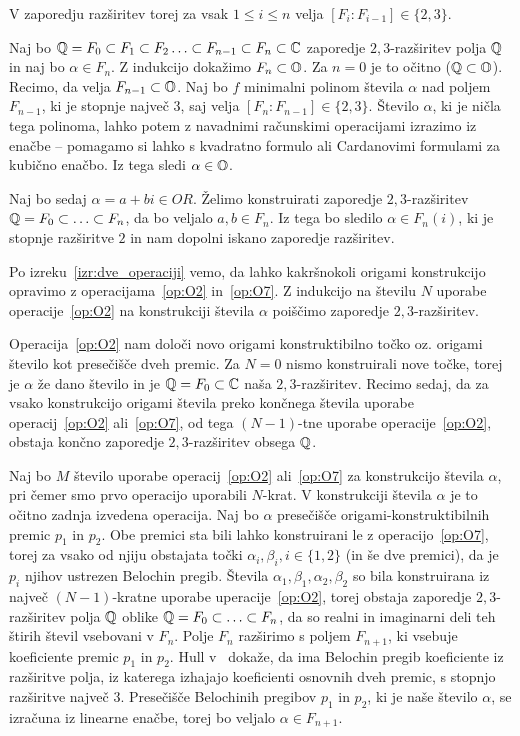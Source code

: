 \begin{dokaz}
    V zaporedju razširitev torej za vsak $ 1 \leq i \leq n$ velja $[F_i: F_{i-1}] \in \{2,3\}$.

    Naj bo $ \mathbb Q = F_0 \subset F_1 \subset F_2 \ldots \subset F_{n-1} \subset F_n \subset \mathbb C $ zaporedje $2,3$-razširitev polja $\mathbb Q$ in naj bo $\alpha \in F_n$. Z indukcijo dokažimo $F_n \subset \mathbb O$. Za $n = 0$ je to očitno ($\mathbb Q \subset \mathbb O$). Recimo, da velja $F_{n-1} \subset \mathbb O$. Naj bo $f$ minimalni polinom števila $\alpha$ nad poljem $  F_{n-1}$, ki je stopnje največ $3$, saj velja $[F_n : F_{n-1}] \in \{2,3\}$. Število $\alpha$, ki je ničla tega polinoma, lahko potem z navadnimi računskimi operacijami izrazimo iz enačbe -- pomagamo si lahko s kvadratno formulo ali Cardanovimi formulami za kubično enačbo. Iz tega sledi $\alpha \in \mathbb O$.

    Naj bo sedaj $\alpha = a+bi \in OR$. Želimo konstruirati zaporedje $2,3$-razširitev $\mathbb Q = F_0 \subset \ldots \subset F_n$, da bo veljalo $a, b \in F_n$. Iz tega bo sledilo $\alpha \in F_n(i)$, ki je stopnje razširitve $2$ in nam dopolni iskano zaporedje razširitev.

    Po izreku~\ref{izr:dve_operaciji} vemo, da lahko kakršnokoli origami konstrukcijo opravimo z operacijama~\ref{op:O2} in~\ref{op:O7}. Z indukcijo na številu $N$ uporabe operacije~\ref{op:O2} na konstrukciji števila $\alpha$ poiščimo zaporedje $2,3$-razširitev.

    Operacija~\ref{op:O2} nam določi novo origami konstruktibilno točko oz. origami število kot presečišče dveh premic. Za $N = 0$ nismo konstruirali nove točke, torej je $\alpha$ že dano število in je $\mathbb Q = F_0 \subset \mathbb C$ naša $2,3$-razširitev. Recimo sedaj, da za vsako konstrukcijo origami števila preko končnega števila uporabe operacij~\ref{op:O2} ali~\ref{op:O7}, od tega $(N-1)$-tne uporabe operacije~\ref{op:O2}, obstaja končno zaporedje $2,3$-razširitev obsega $\mathbb Q$.
    
    Naj bo $M$ število uporabe operacij~\ref{op:O2} ali~\ref{op:O7} za konstrukcijo števila $\alpha$, pri čemer smo prvo operacijo uporabili $N$-krat. V konstrukciji števila $\alpha$ je to očitno zadnja izvedena operacija. Naj bo $\alpha$ presečišče origami-konstruktibilnih premic $p_1$ in $p_2$. Obe premici sta bili lahko konstruirani le z operacijo~\ref{op:O7}, torej za vsako od njiju obstajata točki $\alpha_i, \beta_i, i \in \{1,2\}$ (in še dve premici), da je $p_i$ njihov ustrezen Belochin pregib. Števila $\alpha_1, \beta_1, \alpha_2, \beta_2$ so bila konstruirana iz največ $(N-1)$-kratne uporabe uperacije~\ref{op:O2}, torej obstaja zaporedje $2,3$-razširitev polja $\mathbb Q$ oblike $\mathbb Q = F_0 \subset \ldots \subset F_n$, da so realni in imaginarni deli teh štirih števil vsebovani v $F_n$. Polje $F_n$ razširimo s poljem $F_{n+1}$, ki vsebuje koeficiente premic $p_1$ in $p_2$. Hull v~\cite[str.\ 51--52]{hull2020} dokaže, da ima Belochin pregib koeficiente iz razširitve polja, iz katerega izhajajo koeficienti osnovnih dveh premic, s stopnjo razširitve največ $3$. Presečišče Belochinih pregibov $p_1$ in $p_2$, ki je naše število $\alpha$, se izračuna iz linearne enačbe, torej bo veljalo $\alpha \in F_{n+1}$.
\end{dokaz}

